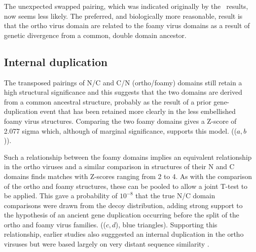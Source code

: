The unexpected swapped pairing, which was indicated originally by the \DALI\ results, now seems
less likely.  The preferred, and biologically more reasonable, result is that the ortho virus
domain are related to the foamy virus domains as a result of genetic divergence from
a common, double domain ancestor. 

%
%
%
%

\subsection{Internal duplication}

The transposed pairings of N/C and C/N (ortho/foamy) domains still retain a high structural
significance and this suggests that the two domains are derived from a common ancestral structure,
probably as the result of a prior gene-duplication event that has been retained more clearly
in the less embellished foamy virus structures.   Comparing the two foamy domains gives
a Z-score of 2.077 sigma which, although of marginal significance, supports this model.
(($a,b$)).

Such a relationship between the foamy domains implies an equivalent relationship
in the ortho viruses and a similar comparison in structures of their N and C domains
finds matches with Z-scores ranging from 2 to 4.   As with the comparison of the 
ortho and foamy structures, these can be pooled to allow a joint T-test to be applied.  
This gave a probability of $10^{-8}$ that the true N/C domain
comparisons were drawn from the decoy distribution, adding strong support to the
hypothesis of an ancient gene duplication occurring before the split of the ortho 
and foamy virus families. (($c,d$), blue triangles).
Supporting this relationship, earlier studies also sugggested an internal duplication
in the ortho virsuses but were based largely on very distant sequence similarity 
\cite{CampillosMet06}.

